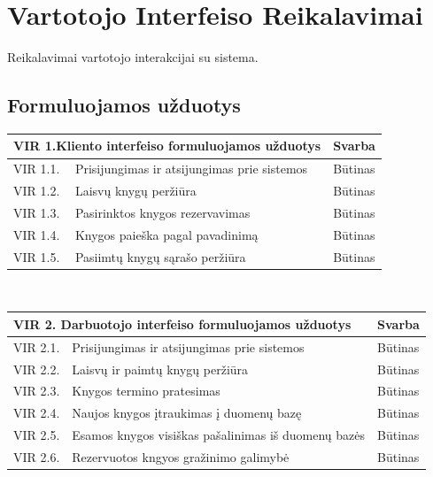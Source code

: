 \documentclass{VUMIFPSkursinis}
\begin{document}
\section{Vartotojo Interfeiso Reikalavimai}
Reikalavimai vartotojo interakcijai su sistema.
\subsection{Formuluojamos užduotys}
\noindent
\vspace{5mm}
    	\begin{tabular}{ | p{} | p{} | p{} |}
    		\hline
   			 \multicolumn{2}{|l|}{   VIR 1.Kliento interfeiso formuluojamos užduotys} &Svarba  \\ \hline 
		  	VIR 1.1. & Prisijungimas ir atsijungimas prie sistemos & Būtinas \\ \hline
            VIR 1.2. & Laisvų knygų peržiūra & Būtinas \\ \hline
            VIR 1.3. & Pasirinktos knygos rezervavimas & Būtinas \\ \hline
            VIR 1.4. & Knygos paieška pagal pavadinimą & Būtinas \\ \hline
            VIR 1.5. & Pasiimtų knygų sąrašo peržiūra & Būtinas \\ \hline
   		\end{tabular}\\
    
    \noindent
\vspace{5mm}
    	\begin{tabular}{ | p{} | p{} | p{} |}
    		\hline
             \multicolumn{2}{|l|}{   VIR 2. Darbuotojo interfeiso formuluojamos užduotys} &Svarba  \\ \hline 
            VIR 2.1. & Prisijungimas ir atsijungimas prie sistemos & Būtinas \\ \hline
            VIR 2.2. & Laisvų ir paimtų knygų peržiūra & Būtinas \\ \hline
            VIR 2.3. & Knygos termino pratesimas & Būtinas \\ \hline
            VIR 2.4. & Naujos knygos įtraukimas į duomenų bazę & Būtinas \\ \hline
            VIR 2.5. & Esamos knygos visiškas pašalinimas iš duomenų bazės & Būtinas \\ \hline
            VIR 2.6. & Rezervuotos kngyos gražinimo galimybė & Būtinas \\ \hline
   		\end{tabular}\\
        
\end{document}
